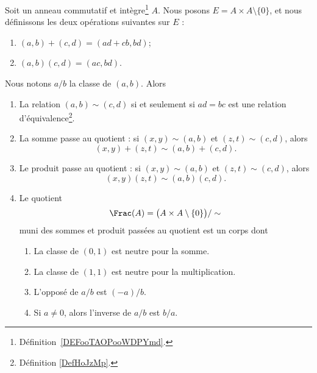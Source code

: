 \begin{proposition}       \label{DEFooGJYXooOiJQvP}
	Soit un anneau commutatif et intègre\footnote{Définition~\ref{DEFooTAOPooWDPYmd}.} \( A\). Nous posons \( E=A\times A\setminus\{ 0 \}\), et nous définissons les deux opérations suivantes sur \( E\) :
	\begin{enumerate}
		\item       \label{ITEMooWBWHooYsXFkO}
		      \( (a,b)+(c,d)=(ad+cb,bd)\);
		\item       \label{ITEMooGOOIooCHqLRl}
		      \( (a,b)(c,d)=(ac,bd)\).
	\end{enumerate}
	Nous notons \( a/b\) la classe de \( (a,b)\). Alors
	\begin{enumerate}
		\item	\label{ITEMooRXFAooUqQfIV}
		      La relation \( (a,b)\sim(c,d)\) si et seulement si \( ad=bc\) est une relation d'équivalence\footnote{Définition \ref{DefHoJzMp}.}.
		\item		\label{ITEMooSFZEooUqFGIB}
		      La somme passe au quotient : si \( (x,y)\sim(a,b)\) et \( (z,t)\sim(c,d)\), alors
		      \begin{equation}
			      (x,y)+(z,t)\sim(a,b)+(c,d).
		      \end{equation}
		\item   \label{ITEMooIZDTooEoALGh}
		      Le produit passe au quotient : si \( (x,y)\sim(a,b)\) et \( (z,t)\sim(c,d)\), alors
		      \begin{equation}
			      (x,y)(z,t)\sim(a,b)(c,d).
		      \end{equation}

		\item		\label{ITEMooOTZJooMkarjT}
		      Le quotient
		      \begin{equation}
			      \Frac(A)=\big( A\times A\setminus\{ 0 \} \big)/\sim
		      \end{equation}
		      muni des sommes et produit passées au quotient est un corps dont
		      \begin{enumerate}
			      \item \label{ITEMooLFSEooAIrbFK}
			            La classe de \( (0,1)\) est neutre pour la somme.
			      \item	\label{ITEMooYUNEooAKZJEh}
			            La classe de \( (1,1)\) est neutre pour la multiplication.
			      \item		\label{ITEMooOGPCooAZGWoF}
			            L'opposé de \( a/b\) est \( (-a)/b\).
			      \item		\label{ITEMooECDBooJdJEza}
			            Si \( a\neq 0\), alors l'inverse de \( a/b\) est \( b/a\).
		      \end{enumerate}


\end{enumerate}
\end{proposition}
